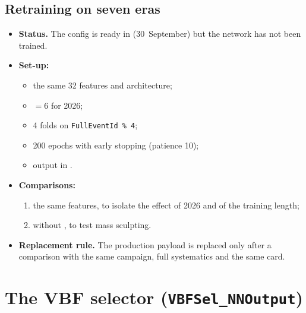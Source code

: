 \documentclass[11pt,a4paper]{article}
\begin{document}
\subsection{Retraining on seven eras}\label{sec:retraining}
\begin{itemize}
  \item \textbf{Status.} The config is ready in 
  (30~September) but the network has not been trained.
  \item \textbf{Set-up:}
  \begin{itemize}
    \item the same 32 features and architecture;
    \item {} $=6$ for 2026;
    \item 4 folds on \texttt{FullEventId~\%~4};
    \item 200 epochs with early stopping (patience 10);
    \item output in .
  \end{itemize}
  \item \textbf{Comparisons:}
  \begin{enumerate}
    \item the same features, to isolate the effect of 2026 and of the training
    length;
    \item without , to test mass sculpting.
  \end{enumerate}
  \item \textbf{Replacement rule.} The production payload is replaced only after
  a comparison with the same campaign, full systematics and the same card.
\end{itemize}

\section{The VBF selector (\texttt{VBFSel\_NNOutput})}\label{sec:vbfsel}
\end{document}
